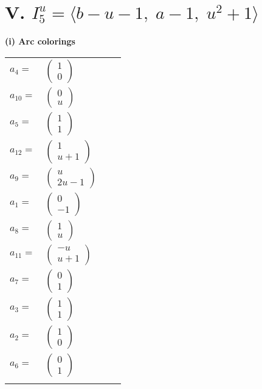 \documentclass[1p]{elsarticle_modified}
\theoremstyle{definition}
\begin{document}
\centering \section*{V. $I^u_{5}= \langle b- u-1,\;a-1,\;u^2+1 \rangle$}
\flushleft \textbf{(i) Arc colorings}\\
\begin{tabular}{m{7pt} m{180pt} m{7pt} m{180pt} }
\flushright $a_{4}=$&$\begin{pmatrix}1\\0\end{pmatrix}$ \\
\flushright $a_{10}=$&$\begin{pmatrix}0\\u\end{pmatrix}$ \\
\flushright $a_{5}=$&$\begin{pmatrix}1\\1\end{pmatrix}$ \\
\flushright $a_{12}=$&$\begin{pmatrix}1\\u+1\end{pmatrix}$ \\
\flushright $a_{9}=$&$\begin{pmatrix}u\\2 u-1\end{pmatrix}$ \\
\flushright $a_{1}=$&$\begin{pmatrix}0\\-1\end{pmatrix}$ \\
\flushright $a_{8}=$&$\begin{pmatrix}1\\u\end{pmatrix}$ \\
\flushright $a_{11}=$&$\begin{pmatrix}- u\\u+1\end{pmatrix}$ \\
\flushright $a_{7}=$&$\begin{pmatrix}0\\1\end{pmatrix}$ \\
\flushright $a_{3}=$&$\begin{pmatrix}1\\1\end{pmatrix}$ \\
\flushright $a_{2}=$&$\begin{pmatrix}1\\0\end{pmatrix}$ \\
\flushright $a_{6}=$&$\begin{pmatrix}0\\1\end{pmatrix}$\\&\end{tabular}
\end{document}
